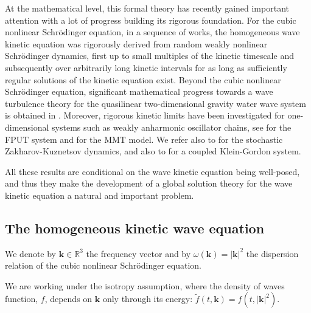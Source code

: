 \documentclass[reqno,11pt,letterpaper]{amsart}
\numberwithin{equation}{section}
\begin{document}
At the mathematical level, this formal theory has recently gained important attention with a lot of progress building its rigorous foundation. For the cubic nonlinear Schr\"odinger equation, in a
sequence of works, the homogeneous wave kinetic equation was rigorously derived from random weakly nonlinear Schr\"odinger dynamics, \cite{DengHani1,DengHani1/2, DengHani2, DengHani3} first up to small multiples of the kinetic timescale and subsequently
over arbitrarily long kinetic intervals for as long as sufficiently regular solutions of the kinetic equation exist. 
Beyond the cubic nonlinear Schr\"odinger equation, significant mathematical progress towards a wave turbulence theory for the quasilinear two-dimensional gravity water wave system is obtained in \cite{DengIonescuPusateriI,DengIonescuPusateriII}. Moreover, rigorous kinetic limits have been investigated for one-dimensional systems such as weakly anharmonic oscillator chains, see \cite{VassilevWu2026} for the FPUT system and \cite{Vassilev2025} for the MMT model. We refer also to \cite{StaffilaniTran2021} for the stochastic Zakharov-Kuznetsov dynamics, and also to  \cite{deSuzzoniStingoTouati2025} for a  coupled Klein-Gordon system. 

All  these results are conditional on the wave kinetic equation being well-posed, and thus they  make the development of a global solution theory
for the wave kinetic equation a natural and important problem. 

\subsection{The homogeneous kinetic wave equation} 
We denote by $\textbf{k} \in \mathbb{R}^3$ the frequency vector and by $\omega(\textbf{k}) = |\textbf{k}|^2$ the dispersion relation of the cubic nonlinear Schr\"odinger equation.

We are working under the isotropy assumption, where the density of waves function, $f$,  depends on
$\textbf{k}$ only through its energy:
$\widetilde f(t,\mathbf{k}) = f(t,|\mathbf{k}|^2).$ 
\end{document}
